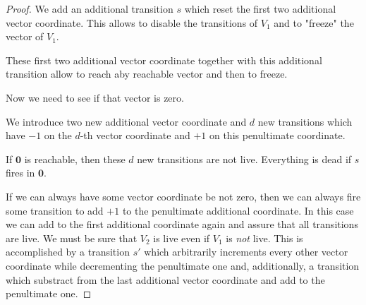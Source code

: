 \begin{proof}


We add an additional transition $s$ which reset the first two additional vector coordinate.
This allows to disable the transitions of $V_1$ and to "freeze" the vector of $V_1$.


These first two additional vector coordinate together with this additional transition allow
to reach aby reachable vector and then to freeze.


Now we need to see if that vector is zero.

We introduce two new additional vector coordinate and $d$ new transitions which have
$-1$ on the $d$-th vector coordinate and $+1$ on this penultimate coordinate. 


If $\textbf{0}$ is reachable, then these $d$ new transitions are not live. Everything is dead if $s$ fires in $\textbf{0}$.


If we can always have some vector coordinate be not zero, then we can always fire some transition to add $+1$ to the penultimate additional coordinate.
In this case we can add to the first additional coordinate again and assure that all transitions are live.
We must be sure that $V_2$ is live even if $V_1$ is {\em not} live.
This is accomplished by a transition $s'$ which arbitrarily increments every other vector coordinate 
while decrementing the penultimate one and, additionally, a transition which 
substract from the last additional vector coordinate and add to the penultimate one. 



\end{proof}
